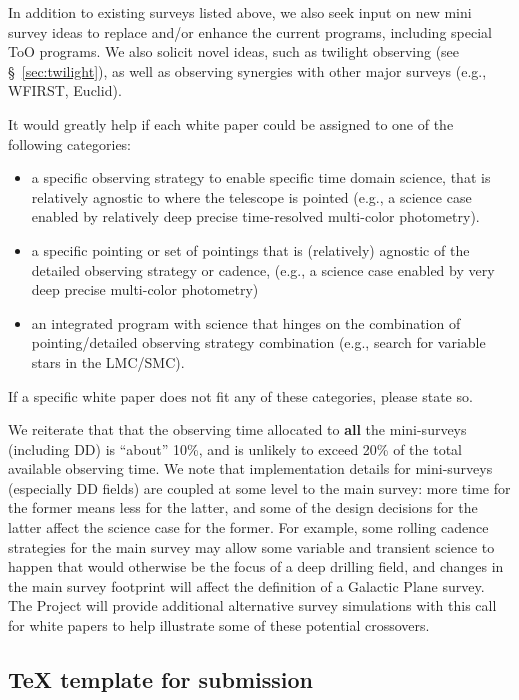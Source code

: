 \documentclass[DM,lsstdraft,toc,usenatbib]{lsstdoc}
\begin{document}
In addition to existing surveys listed above, we also seek input on new mini survey ideas 
to replace and/or enhance the current programs, including special ToO programs. We also 
solicit novel ideas, such as twilight observing (see \S~\ref{sec:twilight}),
as well as observing synergies with other major surveys (e.g., WFIRST, Euclid). 

It would greatly help if each white paper could be assigned to one of the following
categories:  
\begin{itemize} 
\item a specific observing strategy to enable specific time domain science, 
	that is relatively agnostic to where the telescope is pointed (e.g., a science case enabled 
	by relatively deep precise time-resolved multi-color photometry). 
\item a specific pointing or set of pointings that is (relatively) agnostic of the detailed observing 
	strategy or cadence, (e.g., a science case enabled by very deep precise multi-color 
	photometry)
\item an integrated program with science that hinges on the combination of pointing/detailed 
	observing strategy combination (e.g., search for variable stars in the 
	LMC/SMC). 
\end{itemize}  
If a specific white paper does not fit any of these categories, please state so.

We reiterate that that the observing time allocated to {\bf all} the mini-surveys 
(including DD) is ``about'' 10\%, and is unlikely to exceed 20\% of the total available
observing time. We note that implementation details for mini-surveys (especially DD fields)
are coupled at some level to the main survey: more time for the former means less 
for the latter, and some of the design decisions for the latter affect the science
case for the former.  For example, some rolling cadence strategies for the main survey  
may allow some variable and transient science to happen that would otherwise be the 
focus of a deep drilling field, and changes in the main survey footprint will affect the 
definition of a Galactic Plane survey. The Project will provide additional alternative 
survey simulations with this call for white papers to help illustrate some of these potential 
crossovers. 

\subsection{TeX template for submission \label{sec:textemplate}} 
\end{document}
